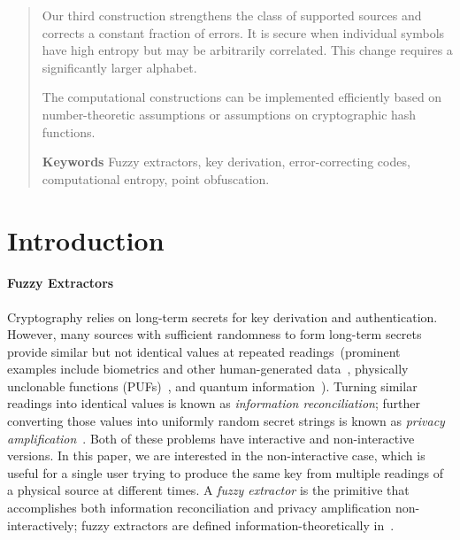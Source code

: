 \documentclass[11pt]{article}
\begin{document}
\begin{abstract}
\begin{itemize}
Our third construction strengthens the class of supported sources and corrects a constant fraction of errors.  It is secure when individual symbols have high entropy but may be arbitrarily correlated.  This change requires a significantly larger alphabet.

The computational constructions can be implemented efficiently based on number-theoretic assumptions or assumptions on cryptographic hash functions.
\end{itemize}

\medskip

\textbf{Keywords} Fuzzy extractors, key derivation, error-correcting codes, computational entropy, point obfuscation.
\end{abstract}


\section{Introduction}\label{sec:introduction}

\paragraph{Fuzzy Extractors}
Cryptography relies on long-term secrets for key derivation and authentication. However, many sources with sufficient randomness to form long-term secrets provide similar but not identical values at repeated readings~(prominent examples include biometrics and other human-generated data~\cite{daugman2004,zviran1993comparison,brostoff2000passfaces,ellison2000protecting,mayrhofer2009shake,monrose2002password},
physically unclonable functions (PUFs)~\cite{pappu2002physical,tuyls2006puf,gassend2002silicon,suh2007physical},
and quantum information~\cite{bennett1988privacy}). Turning similar readings into identical values is known as \emph{information reconciliation}; further converting those values into uniformly random secret strings is known as \emph{privacy amplification}~\cite{bennett1988privacy}.
Both of these problems have interactive and non-interactive versions.  In this paper, we are interested in the non-interactive case, which is useful for a single user trying to produce the same key from multiple readings of a physical source at different times.
 A \emph{fuzzy extractor} is the primitive that accomplishes both information reconciliation and privacy amplification non-interactively; fuzzy extractors are defined information-theoretically in~\cite{DBLP:journals/siamcomp/DodisORS08}.
\end{document}

